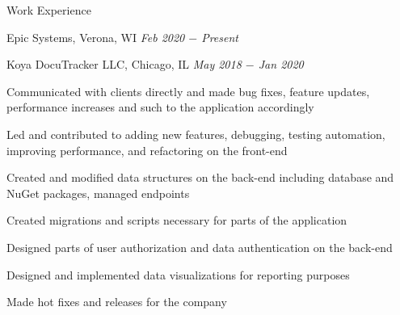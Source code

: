 \documentclass{resume}
\begin{document}
\begin{rSection}{Work Experience}

\begin{rSubsection}{Epic Systems, Verona, WI} {\textit{Feb 2020 $-$ Present}}
{}

\end{rSubsection}

\begin{rSubsection}{Koya DocuTracker LLC, Chicago, IL} {\textit{May 2018 $-$ Jan 2020}}
{}

    \item Communicated with clients directly and made bug fixes, feature updates, performance increases and such to the application accordingly
    \item Led and contributed to adding new features, debugging, testing automation, improving performance, and refactoring on the front-end
    \item Created and modified data structures on the back-end including database and NuGet packages, managed endpoints
    \item Created migrations and scripts necessary for parts of the application
    \item Designed parts of user authorization and data authentication on the back-end
    \item Designed and implemented data visualizations for reporting purposes
    \item Made hot fixes and releases for the company

\end{rSubsection}

\end{rSection}
\end{document}
